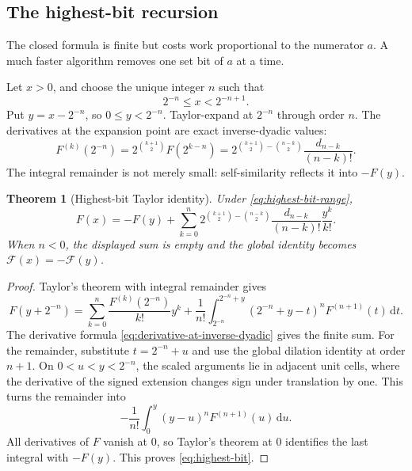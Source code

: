 \documentclass[11pt]{article}
\numberwithin{equation}{section}
\newtheorem{theorem}{Theorem}[section]
\theoremstyle{definition}
\theoremstyle{remark}
\newcommand{\GF}{\mathcal F}
\newcommand{\dd}{\,\mathrm d}
\begin{document}
\subsection{The highest-bit recursion}\label{subsec:highest-bit}

The closed formula is finite but costs work proportional to the numerator $a$.  A much faster algorithm removes one set bit of $a$ at a time.

Let $x>0$, and choose the unique integer $n$ such that
\begin{equation}\label{eq:highest-bit-range}
 2^{-n}\le x<2^{-n+1}.
\end{equation}
Put $y=x-2^{-n}$, so $0\le y<2^{-n}$.  Taylor-expand at $2^{-n}$ through order $n$.  The derivatives at the expansion point are exact inverse-dyadic values:
\begin{equation}\label{eq:derivative-at-inverse-dyadic}
 F^{(k)}(2^{-n})
 =2^{\binom{k+1}{2}}F(2^{k-n})
 =2^{\binom{k+1}{2}-\binom{n-k}{2}}
   \frac{d_{n-k}}{(n-k)!}.
\end{equation}
The integral remainder is not merely small: self-similarity reflects it into $-F(y)$.

\begin{theorem}[Highest-bit Taylor identity]\label{thm:highest-bit}
Under \eqref{eq:highest-bit-range},
\begin{equation}\label{eq:highest-bit}
\boxed{
 F(x)=-F(y)+
 \sum_{k=0}^{n}
 2^{\binom{k+1}{2}-\binom{n-k}{2}}
 \frac{d_{n-k}}{(n-k)!}\frac{y^k}{k!}.}
\end{equation}
When $n<0$, the displayed sum is empty and the global identity becomes
$\GF(x)=-\GF(y)$.
\end{theorem}

\begin{proof}
Taylor's theorem with integral remainder gives
\begin{equation}\label{eq:highest-bit-Taylor-proof}
 F(y+2^{-n})=
 \sum_{k=0}^{n}\frac{F^{(k)}(2^{-n})}{k!}y^k
 +\frac1{n!}\int_{2^{-n}}^{2^{-n}+y}
       (2^{-n}+y-t)^nF^{(n+1)}(t)\dd t.
\end{equation}
The derivative formula \eqref{eq:derivative-at-inverse-dyadic} gives the finite sum.  For the remainder, substitute $t=2^{-n}+u$ and use the global dilation identity at order $n+1$.  On $0<u<y<2^{-n}$, the scaled arguments lie in adjacent unit cells, where the derivative of the signed extension changes sign under translation by one.  This turns the remainder into
\[
 -\frac1{n!}\int_0^y(y-u)^nF^{(n+1)}(u)\dd u.
\]
All derivatives of $F$ vanish at $0$, so Taylor's theorem at $0$ identifies the last integral with $-F(y)$.  This proves \eqref{eq:highest-bit}.
\end{proof}
\end{document}
